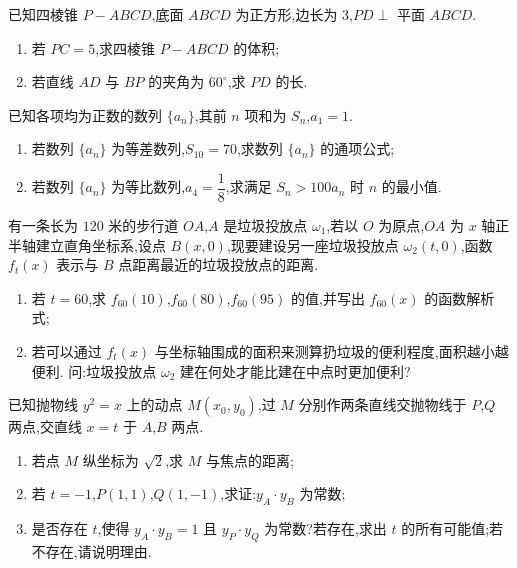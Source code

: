 \begin{problem}
已知四棱锥 \(P-ABCD\),底面 \(ABCD\) 为正方形,边长为 \(3\),\(PD\perp\) 平面 \(ABCD\).
\begin{enumerate}
\item 若 \(PC=5\),求四棱锥 \(P-ABCD\) 的体积;
\item 若直线 \(AD\) 与 \(BP\) 的夹角为 \(60^\circ\),求 \(PD\) 的长.
\end{enumerate}

\end{problem}

\begin{problem}
已知各项均为正数的数列 \(\{a_n\}\),其前 \(n\) 项和为 \(S_n\),\(a_1=1\).
\begin{enumerate}
\item 若数列 \(\{a_n\}\) 为等差数列,\(S_{10}=70\),求数列 \(\{a_n\}\) 的通项公式;
\item 若数列 \(\{a_n\}\) 为等比数列,\(a_4=\dfrac{1}{8}\),求满足 \(S_n>100a_n\) 时 \(n\) 的最小值.
\end{enumerate}
\end{problem}

\begin{problem}
有一条长为 \(120\) 米的步行道 \(OA\),\(A\) 是垃圾投放点 \(\omega_1\),若以 \(O\) 为原点,\(OA\) 为 \(x\) 轴正半轴建立直角坐标系,设点 \(B(x,0)\),现要建设另一座垃圾投放点 \(\omega_2(t,0)\),函数 \(f_t(x)\) 表示与 \(B\) 点距离最近的垃圾投放点的距离.
\begin{enumerate}
\item 若 \(t=60\),求 \(f_{60}(10)\),\(f_{60}(80)\),\(f_{60}(95)\) 的值,并写出 \(f_{60}(x)\) 的函数解析式;
\item 若可以通过 \(f_t(x)\) 与坐标轴围成的面积来测算扔垃圾的便利程度,面积越小越便利. 问:垃圾投放点 \(\omega_2\) 建在何处才能比建在中点时更加便利?
\end{enumerate}
\end{problem}

\begin{problem}
已知抛物线 \(y^2=x\) 上的动点 \(M(x_0,y_0)\),过 \(M\) 分别作两条直线交抛物线于 \(P\),\(Q\) 两点,交直线 \(x=t\) 于 \(A\),\(B\) 两点.
\begin{enumerate}
\item 若点 \(M\) 纵坐标为 \(\sqrt{2}\),求 \(M\) 与焦点的距离;
\item 若 \(t=-1\),\(P(1,1)\),\(Q(1,-1)\),求证:\(y_A\cdot y_B\) 为常数;
\item 是否存在 \(t\),使得 \(y_A\cdot y_B=1\) 且 \(y_P\cdot y_Q\) 为常数?若存在,求出 \(t\) 的所有可能值;若不存在,请说明理由.
\end{enumerate}
\end{problem}

